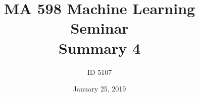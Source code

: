\documentclass[10pt,letterpaper]{article}
\def\IDCode{5107}
\def\Title{MA 598}
\def\HomeworkNumber{4}
\def\DueBy{January 25, 2019}
\numberwithin{problem}{section}
\numberwithin{equation}{section}
\begin{document}
\title{\Title{} Machine Learning Seminar \\ Summary \HomeworkNumber{}}%
\author{ID \IDCode{}}%
\date{\DueBy{}}%
\maketitle


\end{document}
